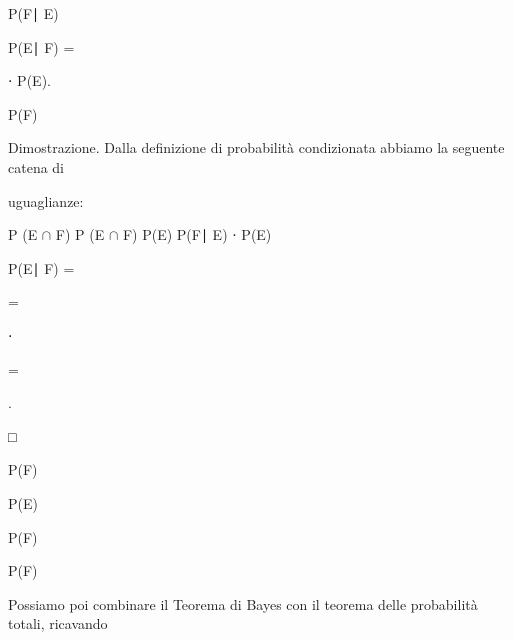 \documentclass[a4paper,portrait,12pt]{article}
\begin{document}
\begin{flushleft}
P(F∣ E)
\end{flushleft}


\begin{flushleft}
P(E∣ F) =
\end{flushleft}


\begin{flushleft}
⋅ P(E).
\end{flushleft}


\begin{flushleft}
P(F)
\end{flushleft}





\begin{flushleft}
Dimostrazione. Dalla definizione di probabilit\`{a} condizionata abbiamo la seguente catena di
\end{flushleft}


\begin{flushleft}
uguaglianze:
\end{flushleft}


\begin{flushleft}
P (E $\cap$ F) P (E $\cap$ F) P(E) P(F∣ E) ⋅ P(E)
\end{flushleft}


\begin{flushleft}
P(E∣ F) =
\end{flushleft}


=


⋅


=


.


□


\begin{flushleft}
P(F)
\end{flushleft}


\begin{flushleft}
P(E)
\end{flushleft}


\begin{flushleft}
P(F)
\end{flushleft}


\begin{flushleft}
P(F)
\end{flushleft}


\begin{flushleft}
Possiamo poi combinare il Teorema di Bayes con il teorema delle probabilit\`{a} totali, ricavando
\end{flushleft}
\end{document}
